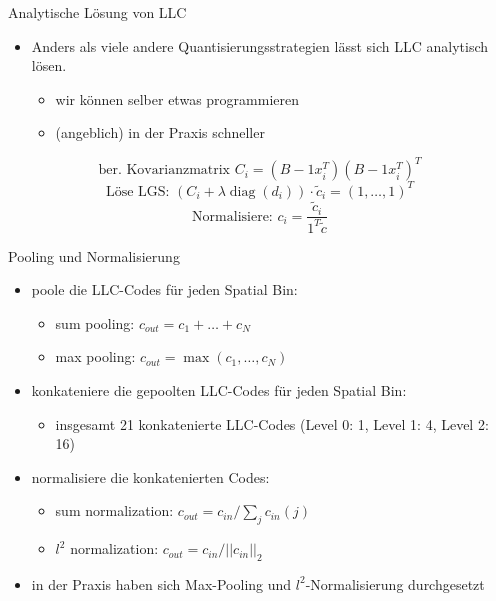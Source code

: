 \begin{frame}[t, fragile]{Analytische Lösung von LLC}
	\begin{itemize}
		\item Anders als viele andere Quantisierungsstrategien lässt sich LLC analytisch lösen.
		\begin{itemize}
			\item wir können selber etwas programmieren
			\item (angeblich) in der Praxis schneller
		\end{itemize}
	\end{itemize}
	\begin{equation*}
		\text{ber. Kovarianzmatrix } C_i = (B-1x_i^T)(B-1x_i^T)^T
	\end{equation*}
	\begin{equation}
		\text{Löse LGS: } (C_i + \lambda\mathop{diag}(d_i)) \cdot \tilde{c}_i = (1, \dots, 1)^T
	\end{equation}
	\begin{equation}
	\text{Normalisiere: } c_i = \frac{\tilde{c}_i}{1^T\tilde{c}}
	\end{equation}
\end{frame}

\begin{frame}[t, fragile]{Pooling und Normalisierung}
	\begin{itemize}
		\item poole die LLC-Codes für jeden Spatial Bin:
		\begin{itemize}
			\item sum pooling: $c_{out} = c_1 + \dots + c_N$
			\item max pooling: $c_{out} = \max(c_1, \dots, c_N)$
		\end{itemize}
		\item konkateniere die gepoolten LLC-Codes für jeden Spatial Bin:
		\begin{itemize}
			\item insgesamt 21 konkatenierte LLC-Codes (Level 0: 1, Level 1: 4, Level 2: 16)
		\end{itemize}
		\item normalisiere die konkatenierten Codes:
		\begin{itemize}
			\item sum normalization: $c_{out} = c_{in} / \sum_{j}c_{in}(j)$
			\item $\mathit{l}^2$ normalization: $c_{out} = c_{in} / ||c_{in}||_2$
		\end{itemize}
		\item in der Praxis haben sich Max-Pooling und $\mathit{l}^2$-Normalisierung durchgesetzt \cite{wyylhg10}
	\end{itemize}
\end{frame}

